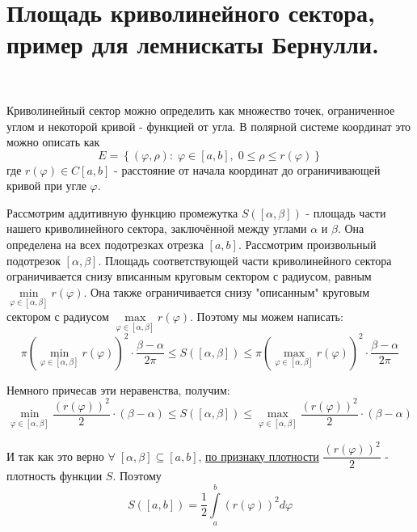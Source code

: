 \documentclass[../main.tex]{subfiles}
\begin{document}
\newpage
\hypertarget{q15}{\section{Площадь криволинейного сектора, пример для лемнискаты Бернулли.}}
\begin{example}
    
    ~

    Криволинейный сектор можно определить как множество точек, ограниченное углом и некоторой кривой - функцией от угла. В полярной системе координат это можно описать как 
    \[ E=\left\{ \left( \varphi , \rho\right): \; \varphi \in \left[ a , b \right],\; 0 \leq \rho \leq r\left( \varphi \right)\right\}\]
    где \( r\left( \varphi \right) \in C\left[ a , b \right]\) - расстояние от начала координат до ограничивающей кривой при угле \( \varphi \).


    Рассмотрим аддитивную функцию промежутка \( S(\left[ \alpha , \beta \right])\) - площадь части нашего криволинейного сектора, заключённой между 
    углами \( \alpha \) и \( \beta \). Она определена на всех подотрезках отрезка \( \left[ a,b\right]\). Рассмотрим произвольный подотрезок \( \left[ \alpha , \beta \right]\).
    Площадь соответствующей части криволинейного сектора ограничивается снизу вписанным круговым сектором с радиусом, равным \( \min\limits_{ \varphi \in \left[ \alpha , \beta \right]} r\left( \varphi \right)\). 
    Она также ограничивается снизу "описанным" круговым сектором с радиусом \( \max\limits_{ \varphi \in \left[ \alpha , \beta \right]} r\left( \varphi \right)\). Поэтому мы можем написать:
    \[ \pi \left( \min\limits_{ \varphi \in \left[ \alpha , \beta \right]} r\left( \varphi \right) \right)^2\cdot \dfrac{ \beta-\alpha}{ 2 \pi } \leq S(\left[ \alpha , \beta \right]) \leq \pi \left( \max\limits_{ \varphi \in \left[ \alpha , \beta \right]} r\left( \varphi \right) \right)^2\cdot \dfrac{ \beta-\alpha}{ 2 \pi }\]

    Немного причесав эти неравенства, получим:
    \[ \min\limits_{ \varphi \in \left[ \alpha , \beta \right]} \dfrac{ (r\left(\varphi\right))^2}{ 2}\cdot \left( \beta - \alpha \right) \leq S(\left[ \alpha , \beta \right]) \leq \max\limits_{ \varphi \in \left[ \alpha , \beta \right]} \dfrac{ (r\left(\varphi\right))^2}{ 2}\cdot \left( \beta - \alpha \right)\]

    И так как это верно \( \forall \; \left[ \alpha , \beta \right] \subseteq  \left[ a,b\right]\), \hyperlink{density_thm}{по признаку плотности} \( \dfrac{ (r\left(\varphi\right))^2}{ 2}\) - плотность функции \( S\). Поэтому
    \[ \boxed{ S\left( \left[ a,b\right]\right)= \dfrac{ 1}{ 2}\displaystyle\int\limits_{ a}^{ b}\left( r\left( \varphi \right)\right)^2d \varphi }\]
\end{example}
\end{document}
